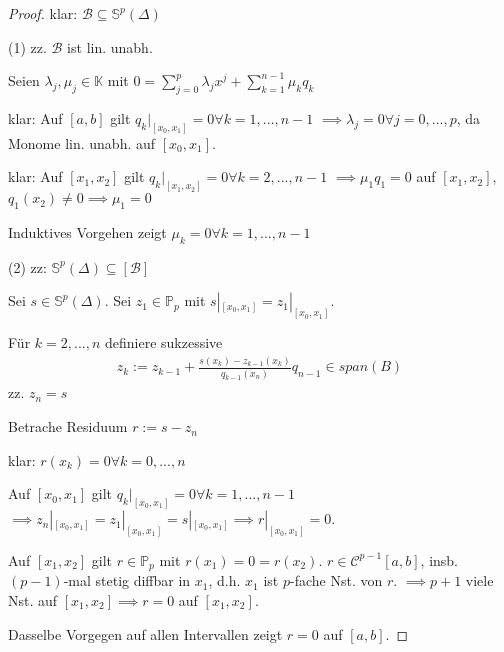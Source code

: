 \begin{proof}
	klar: $\mathcal{B} \subseteq \mathbb{S}^p(\Delta)$
	
	(1) zz. $\mathcal{B}$ ist lin. unabh.
	
	Seien $\lambda_j, \mu_j \in \mathbb{K}$ mit $0 = \sum_{j=0}^{p} \lambda_j x^j + \sum_{k=1}^{n-1} \mu_k q_k$
	
	klar: Auf $[a, b]$ gilt $q_k|_{[x_0, x_1]} = 0 \forall k=1, ..., n-1$ $\implies \lambda_j = 0 \forall j=0, ..., p$, da Monome lin. unabh. auf $[x_0, x_1]$.
	
	klar: Auf $[x_1, x_2]$ gilt $q_k|_{[x_1, x_2]} = 0 \forall k=2, ..., n-1$ $\implies \mu_1 q_1 = 0$ auf $[x_1, x_2]$, $q_1(x_2) \neq 0 \implies \mu_1 = 0$
	
	Induktives Vorgehen zeigt $\mu_k = 0 \forall k=1, ..., n-1$
	
	(2) zz: $\mathbb{S}^p(\Delta) \subseteq [\mathcal{B}]$
	
	Sei $s \in \mathbb{S}^p(\Delta)$. Sei $z_1 \in \mathbb{P}_p$ mit $s|_{[x_0, x_1]} = z_1|_{[x_0, x_1]}$.
	
	Für $k=2, ..., n$ definiere sukzessive
	\begin{align*}
		z_k := z_{k-1} + \frac{s(x_k) - z_{k-1}(x_k)}{q_{k-1}(x_n)} q_{n-1} \in span(B)
	\end{align*} 
	zz. $z_n = s$
	
	Betrache Residuum $r := s - z_n$
	
	klar: $r(x_k) = 0 \forall k=0, ..., n$
	
	Auf $[x_0, x_1]$ gilt $q_k|_{[x_0, x_1]} = 0 \forall k = 1, ..., n-1$ $\implies z_n|_{[x_0, x_1]} = z_1|_{[x_0, x_1]} = s|_{[x_0, x_1]} \implies r|_{[x_0, x_1]} = 0$.
	
	Auf $[x_1, x_2]$ gilt $r \in \mathbb{P}_p$ mit $r(x_1) = 0 = r(x_2)$. $r \in \mathcal{C}^{p-1}[a,b]$, insb. $(p-1)$-mal stetig diffbar in $x_1$, d.h. $x_1$ ist $p$-fache Nst. von $r$. $\implies p+1$ viele Nst. auf $[x_1, x_2] \implies r = 0$ auf $[x_1, x_2]$.
	
	Dasselbe Vorgegen auf allen Intervallen zeigt $r=0$ auf $[a, b]$. 
\end{proof}

